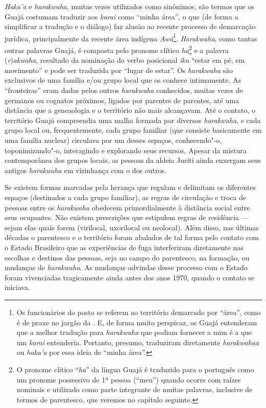 \emph{Haka'a} e \emph{harakwaha}, muitas vezes utilizados como
sinônimos, são termos que os Guajá costumam traduzir aos \emph{karai}
como ``minha área'', o que (de forma a simplificar a tradução e o diálogo)
faz alusão ao recente processo de demarcação jurídica, principalmente da
recente área indígena \emph{Awá}\footnote{Os funcionários do posto se
  referem ao território demarcado por ``área'', como é de praxe no jargão
  da . E, de forma muito perspicaz, os Guajá entenderam que a
  melhor tradução para \emph{harakwaha} que podiam fornecer a mim é a
  que um \emph{karai} entenderia. Portanto, presumo, traduziram
  diretamente \emph{harakwahaa} ou \emph{haka'a} por essa ideia de
  ``minha área''.}. \emph{Harakwaha}, como tantas outras palavras Guajá, é
composta pelo pronome clítico \emph{ha}\footnote{O pronome clítico
  ``\emph{ha}'' da língua Guajá é traduzido para o português como um
  pronome possessivo de 1ª pessoa (``meu'') quando ocorre com raízes
  nominais e utilizado como parte integrante de muitas palavras,
  inclusive de termos de parentesco, que veremos no capítulo seguinte.}
e a palavra (\emph{r})\emph{akwaha}, resultado da nominação do verbo
posicional \emph{iku} ``estar em pé, em movimento'' e pode ser traduzida
por ``lugar de estar''. Os \emph{harakwaha} são exclusivos de uma família
e/ou grupo local que os conhece intimamente. As ``fronteiras'' eram dadas
pelos outros \emph{harakwaha} conhecidos, muitas vezes de germanos ou
cognatos próximos, ligados por parentes de parentes, até uma distância
que a geneaologia e o território não mais alcançavam. Até o contato, o
território Guajá compreendia uma malha formada por diversos
\emph{harakwaha}, e cada grupo local ou, frequentemente, cada grupo
familiar (que consiste basicamente em uma família nuclear) circulava por
um desses espaços, conhecendo"-o, toponimizando"-o, interagindo e
explorando seus recursos. Apesar da mistura contemporânea dos grupos
locais, as pessoas da aldeia Juriti ainda enxergam seus antigos
\emph{harakwaha} em vizinhança com o dos outros.

Se existem formas marcadas pela herança que regulam e delimitam os
diferentes espaços (destinados a cada grupo familiar), as regras de
circulação e troca de pessoas entre os \emph{harakwaha} obedecem
primordialmente à distância social entre seus ocupantes. Não existem
prescrições que estipulem regras de residência --- sejam elas quais forem
(virilocal, uxorilocal ou neolocal). Além disso, nas últimas décadas o
parentesco e o território foram abalados de tal forma pelo contato com o
Estado Brasileiro que as experiências de fuga interferiram diretamente
nas escolhas e destinos das pessoas, seja no campo do parentesco, na
formação, ou mudanças de \emph{harakwaha}. As mudanças advindas desse
processo com o Estado foram vivenciadas tragicamente ainda antes dos
anos 1970, quando o contato se iniciava.


